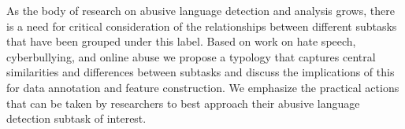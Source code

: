As the body of research on abusive language detection and analysis grows, there is a need for critical consideration of the relationships between different subtasks that have been grouped under this label. Based on work on hate speech, cyberbullying, and online abuse we propose a typology that captures central similarities and differences between subtasks and discuss the implications of this for data annotation and feature construction. We emphasize the practical actions that can be taken by researchers to best approach their abusive language detection subtask of interest.

